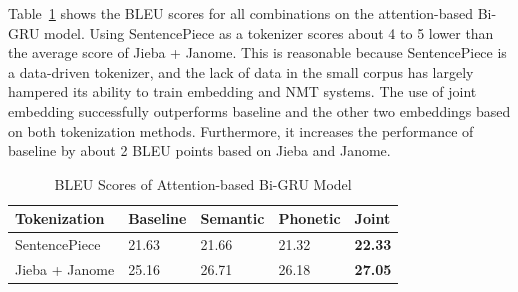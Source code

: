 Table~\ref{tab:seq2seq_bleu_score} shows the BLEU scores for all combinations on the attention-based Bi-GRU model. Using SentencePiece as a tokenizer scores about 4 to 5 lower than the average score of Jieba + Janome. This is reasonable because SentencePiece is a data-driven tokenizer, and the lack of data in the small corpus has largely hampered its ability to train embedding and NMT systems. The use of joint embedding successfully outperforms baseline and the other two embeddings based on both tokenization methods. Furthermore, it increases the performance of baseline by about 2 BLEU points based on Jieba and Janome. 

\begin{table}[t]
    \centering
    \begin{tabularx}{\textwidth}{bbbbb}\toprule
        Tokenization & Baseline & Semantic & Phonetic & Joint \\\midrule
        SentencePiece & 21.63 & 21.66 & 21.32 & \textbf{22.33} \\
        Jieba + Janome & 25.16 & 26.71 & 26.18 & \textbf{27.05} \\\bottomrule
    \end{tabularx}
    \caption{BLEU Scores of Attention-based Bi-GRU Model}
    \label{tab:seq2seq_bleu_score}
\end{table}

